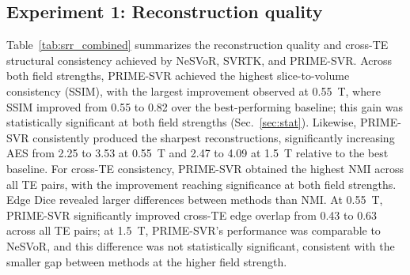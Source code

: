 \documentclass[preprint,authoryear,12pt]{elsarticle}
\begin{document}
\subsection{Experiment 1: Reconstruction quality}
\label{exp:exp1}
Table~\ref{tab:srr_combined} summarizes the reconstruction quality and cross-TE structural consistency achieved by NeSVoR, SVRTK, and PRIME-SVR. Across both field strengths, PRIME-SVR achieved the highest slice-to-volume consistency (SSIM), with the largest improvement observed at 0.55~T, where SSIM improved from 0.55 to 0.82 over the best-performing baseline; this gain was statistically significant at both field strengths (Sec.~\ref{sec:stat}). Likewise, PRIME-SVR consistently produced the sharpest reconstructions, significantly increasing AES from 2.25 to 3.53 at 0.55~T and 2.47 to 4.09 at 1.5~T relative to the best baseline. For cross-TE consistency, PRIME-SVR obtained the highest NMI across all TE pairs, with the improvement reaching significance at both field strengths. Edge Dice revealed larger differences between methods than NMI. At 0.55~T, PRIME-SVR significantly improved cross-TE edge overlap from 0.43 to 0.63 across all TE pairs; at 1.5~T, PRIME-SVR's performance was comparable to NeSVoR, and this difference was not statistically significant, consistent with the smaller gap between methods at the higher field strength.
\end{document}
